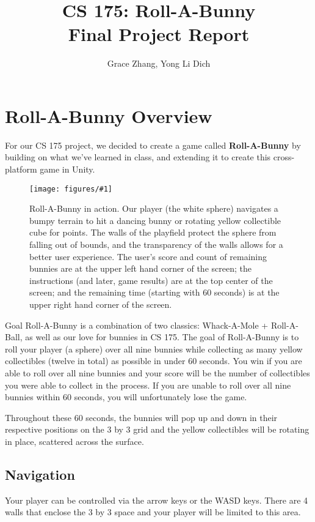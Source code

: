 \documentclass[12pt]{article}
\newcommand{\fig}[3]{\begin{figure}[!ht]
\begin{center}
\texttt{[image: figures/\#1]}
\caption{#2}
\label{#1}
\end{center}
\end{figure}}
\begin{document}
\title{%
  \textbf{CS 175: Roll-A-Bunny \\
  \large Final Project Report}}
\author{Grace Zhang, Yong Li Dich}
\date{}
\maketitle

\newpage
\tableofcontents

\newpage
 
\section{Roll-A-Bunny Overview}
  For our CS 175 project, we decided to create a game called \textbf{Roll-A-Bunny} by building on what we've learned in class, and extending it to create this cross-platform game in Unity.

  \fig{screenshotpic}{Roll-A-Bunny in action. Our player (the white sphere) navigates a bumpy terrain to hit a dancing bunny or rotating yellow collectible cube for points. The walls of the playfield protect the sphere from falling out of bounds, and the transparency of the walls allows for a better user experience. The user's score and count of remaining bunnies are at the upper left hand corner of the screen; the instructions (and later, game results) are at the top center of the screen; and the remaining time (starting with 60 seconds) is at the upper right hand corner of the screen.}

\subsection{Goal}
  Roll-A-Bunny is a combination of two classics: Whack-A-Mole + Roll-A-Ball, as well as our love for bunnies in CS 175. The goal of Roll-A-Bunny is to roll your player (a sphere) over all nine bunnies while collecting as many yellow collectibles (twelve in total) as possible in under 60 seconds. 
  You win if you are able to roll over all nine bunnies and your score will be the number of collectibles you were able to collect in the process. If you are unable to roll over all nine bunnies within 60 seconds, you will unfortunately lose the game.

  Throughout these 60 seconds, the bunnies will pop up and down in their respective positions on the 3 by 3 grid and the yellow collectibles will be rotating in place, scattered across the surface. 
  
\subsection{Navigation}
  Your player can be controlled via the arrow keys or the WASD keys. 
  There are 4 walls that enclose the 3 by 3 space and your player will be limited to this area. 
\end{document}
